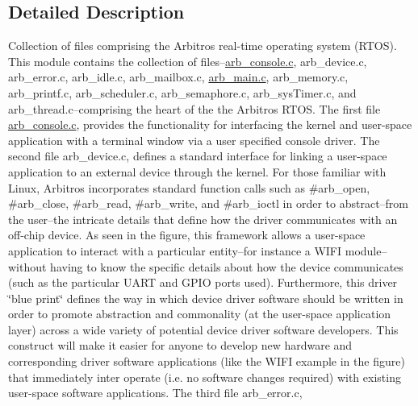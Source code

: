 \subsection{Detailed Description}
Collection of files comprising the Arbitros real-\/time operating system (R\-T\-O\-S). This module contains the collection of files--\hyperlink{arb__console_8c}{arb\-\_\-console.\-c}, arb\-\_\-device.\-c, arb\-\_\-error.\-c, arb\-\_\-idle.\-c, arb\-\_\-mailbox.\-c, \hyperlink{arb__main_8c}{arb\-\_\-main.\-c}, arb\-\_\-memory.\-c, arb\-\_\-printf.\-c, arb\-\_\-scheduler.\-c, arb\-\_\-semaphore.\-c, arb\-\_\-sys\-Timer.\-c, and arb\-\_\-thread.\-c--comprising the heart of the the Arbitros R\-T\-O\-S. The first file \hyperlink{arb__console_8c}{arb\-\_\-console.\-c}, provides the functionality for interfacing the kernel and user-\/space application with a terminal window via a user specified console driver. The second file arb\-\_\-device.\-c, defines a standard interface for linking a user-\/space application to an external device through the kernel. For those familiar with Linux, Arbitros incorporates standard function calls such as \#arb\-\_\-open, \#arb\-\_\-close, \#arb\-\_\-read, \#arb\-\_\-write, and \#arb\-\_\-ioctl in order to abstract--from the user--the intricate details that define how the driver communicates with an off-\/chip device. As seen in the figure, this framework allows a user-\/space application to interact with a particular entity--for instance a W\-I\-F\-I module--without having to know the specific details about how the device communicates (such as the particular U\-A\-R\-T and G\-P\-I\-O ports used). Furthermore, this driver \char`\"{}blue print\char`\"{} defines the way in which device driver software should be written in order to promote abstraction and commonality (at the user-\/space application layer) across a wide variety of potential device driver software developers. This construct will make it easier for anyone to develop new hardware and corresponding driver software applications (like the W\-I\-F\-I example in the figure) that immediately inter operate (i.\-e. no software changes required) with existing user-\/space software applications.  The third file arb\-\_\-error.\-c, 